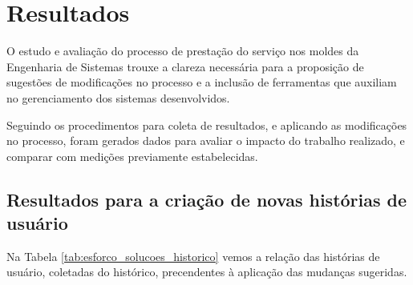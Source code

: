 
\chapter{Resultados}\label{chap:resultados}

	O estudo e avaliação do processo de prestação do serviço nos moldes da Engenharia de Sistemas trouxe a clareza necessária para a proposição de sugestões de modificações no
	processo e a inclusão de ferramentas que auxiliam no gerenciamento dos sistemas desenvolvidos. 
	
	Seguindo os procedimentos para coleta de resultados, e aplicando as modificações no processo, foram gerados dados para avaliar o impacto do trabalho realizado, e comparar com medições
	previamente estabelecidas. 

	\section{Resultados para a criação de novas histórias de usuário}

	Na Tabela \ref{tab:esforco_solucoes_historico} vemos a relação das histórias de usuário, coletadas do histórico, precendentes à aplicação das mudanças sugeridas.

